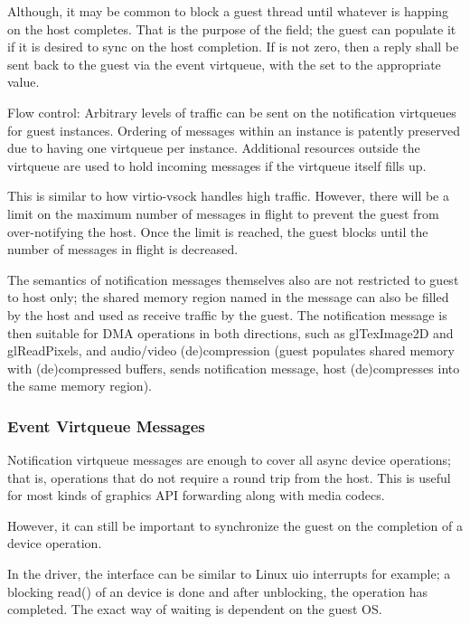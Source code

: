 Although, it may be common to block a guest thread until whatever is happing on the host completes.
That is the purpose of the  field; the guest can populate it
if it is desired to sync on the host completion.
If  is not zero, then a reply shall be sent
back to the guest via the event virtqueue,
with the  set to the appropriate value.

Flow control:
Arbitrary levels of traffic can be sent
on the notification virtqueues for guest instances.
Ordering of messages within an instance is patently preserved
due to having one virtqueue per instance.
Additional resources outside the virtqueue are used to hold incoming messages
if the virtqueue itself fills up.

This is similar to how virtio-vsock handles high traffic.
However, there will be a limit on the maximum number of messages in flight
to prevent the guest from over-notifying the host.
Once the limit is reached, the guest blocks until the number of messages in flight
is decreased.

The semantics of notification messages themselves also are not restricted to guest to host only;
the shared memory region named in the message can also be filled by the host
and used as receive traffic by the guest.
The notification message is then suitable for DMA operations in both directions,
such as glTexImage2D and glReadPixels,
and audio/video (de)compression (guest populates shared memory with (de)compressed buffers,
sends notification message, host (de)compresses into the same memory region).

\subsubsection{Event Virtqueue Messages}\label{sec:Device Types / Host Memory Device / Device Operation / Event Virtqueue Messages}

Notification virtqueue messages are enough to cover all async device operations;
that is, operations that do not require a round trip from the host.
This is useful for most kinds of graphics API forwarding along
with media codecs.

However, it can still be important to synchronize the guest on the completion
of a device operation.

In the driver, the interface can be similar to Linux uio interrupts for example;
a blocking read() of an device is done and after unblocking,
the operation has completed.
The exact way of waiting is dependent on the guest OS.

